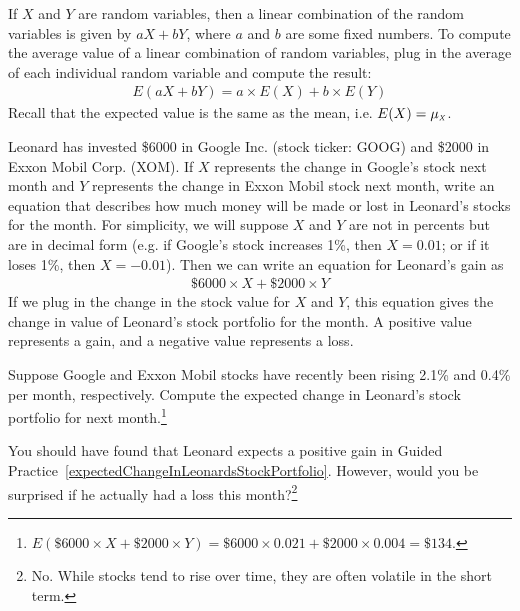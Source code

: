 \begin{termBox}{
If $X$ and $Y$ are random variables, then a linear combination of the random variables is given by $aX + bY$, where $a$ and $b$ are some fixed numbers. To compute the average value of a linear combination of random variables, plug in the average of each individual random variable and compute the result:
\begin{align*}
E(aX+bY) = a\times E(X) + b\times E(Y)
\end{align*}
Recall that the expected value is the same as the mean, i.e. $E(X) = \mu_{\mbox{\tiny\itshape X}}$.}
\end{termBox}

\begin{example}{Leonard has invested \$6000 in Google Inc. (stock ticker: GOOG) and \$2000 in Exxon Mobil Corp. (XOM). If $X$ represents the change in Google's stock next month and $Y$ represents the change in Exxon Mobil stock next month, write an equation that describes how much money will be made or lost in Leonard's stocks for the month.}
For simplicity, we will suppose $X$ and $Y$ are not in percents but are in decimal form (e.g. if Google's stock increases 1\%, then $X=0.01$; or if it loses 1\%, then $X=-0.01$). Then we can write an equation for Leonard's gain as
\begin{align*}
\$6000\times X + \$2000\times Y
\end{align*}
If we plug in the change in the stock value for $X$ and $Y$, this equation gives the change in value of Leonard's stock portfolio for the month. A positive value represents a gain, and a negative value represents a loss.
\end{example}

\begin{exercise}\label{expectedChangeInLeonardsStockPortfolio}
Suppose Google and Exxon Mobil stocks have recently been rising 2.1\% and 0.4\% per month, respectively. Compute the expected change in Leonard's stock portfolio for next month.\footnote{$E(\$6000\times X + \$2000\times Y) = \$6000\times 0.021 + \$2000\times 0.004 = \$134$.}
\end{exercise}

\begin{exercise}
You should have found that Leonard expects a positive gain in Guided Practice~\ref{expectedChangeInLeonardsStockPortfolio}. However, would you be surprised if he actually had a loss this month?\footnote{No. While stocks tend to rise over time, they are often volatile in the short term.}
\end{exercise}

